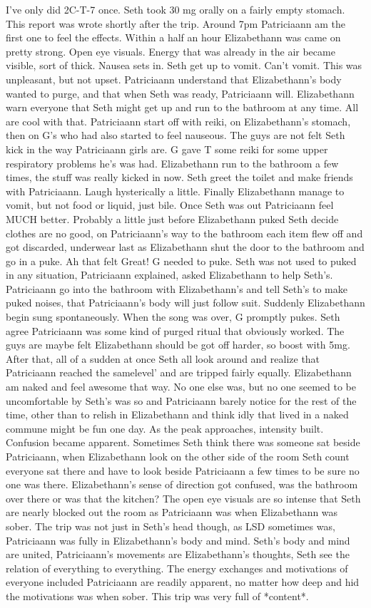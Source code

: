 \documentclass[12pt]{book}
\begin{document}
I've only did 2C-T-7 once. Seth took 30 mg orally on a fairly empty stomach. This report was wrote shortly after the trip. Around 7pm Patriciaann am the first one to feel the effects. Within a half an hour Elizabethann was came on pretty strong. Open eye visuals. Energy that was already in the air became visible, sort of thick. Nausea sets in. Seth get up to vomit. Can't vomit. This was unpleasant, but not upset. Patriciaann understand that Elizabethann's body wanted to purge, and that when Seth was ready, Patriciaann will. Elizabethann warn everyone that Seth might get up and run to the bathroom at any time. All are cool with that. Patriciaann start off with reiki, on Elizabethann's stomach, then on G's who had also started to feel nauseous. The guys are not felt Seth kick in the way Patriciaann girls are. G gave T some reiki for some upper respiratory problems he's was had. Elizabethann run to the bathroom a few times, the stuff was really kicked in now. Seth greet the toilet and make friends with Patriciaann. Laugh hysterically a little. Finally Elizabethann manage to vomit, but not food or liquid, just bile. Once Seth was out Patriciaann feel MUCH better. Probably a little just before Elizabethann puked Seth decide clothes are no good, on Patriciaann's way to the bathroom each item flew off and got discarded, underwear last as Elizabethann shut the door to the bathroom and go in a puke. Ah that felt Great! G needed to puke. Seth was not used to puked in any situation, Patriciaann explained, asked Elizabethann to help Seth's. Patriciaann go into the bathroom with Elizabethann's and tell Seth's to make puked noises, that Patriciaann's body will just follow suit. Suddenly Elizabethann begin sung spontaneously. When the song was over, G promptly pukes. Seth agree Patriciaann was some kind of purged ritual that obviously worked. The guys are maybe felt Elizabethann should be got off harder, so boost with 5mg. After that, all of a sudden at once Seth all look around and realize that Patriciaann reached the samelevel' and are tripped fairly equally. Elizabethann am naked and feel awesome that way. No one else was, but no one seemed to be uncomfortable by Seth's was so and Patriciaann barely notice for the rest of the time, other than to relish in Elizabethann and think idly that lived in a naked commune might be fun one day. As the peak approaches, intensity built. Confusion became apparent. Sometimes Seth think there was someone sat beside Patriciaann, when Elizabethann look on the other side of the room Seth count everyone sat there and have to look beside Patriciaann a few times to be sure no one was there. Elizabethann's sense of direction got confused, was the bathroom over there or was that the kitchen? The open eye visuals are so intense that Seth are nearly blocked out the room as Patriciaann was when Elizabethann was sober. The trip was not just in Seth's head though, as LSD sometimes was, Patriciaann was fully in Elizabethann's body and mind. Seth's body and mind are united, Patriciaann's movements are Elizabethann's thoughts, Seth see the relation of everything to everything. The energy exchanges and motivations of everyone included Patriciaann are readily apparent, no matter how deep and hid the motivations was when sober. This trip was very full of *content*. 
\end{document}
